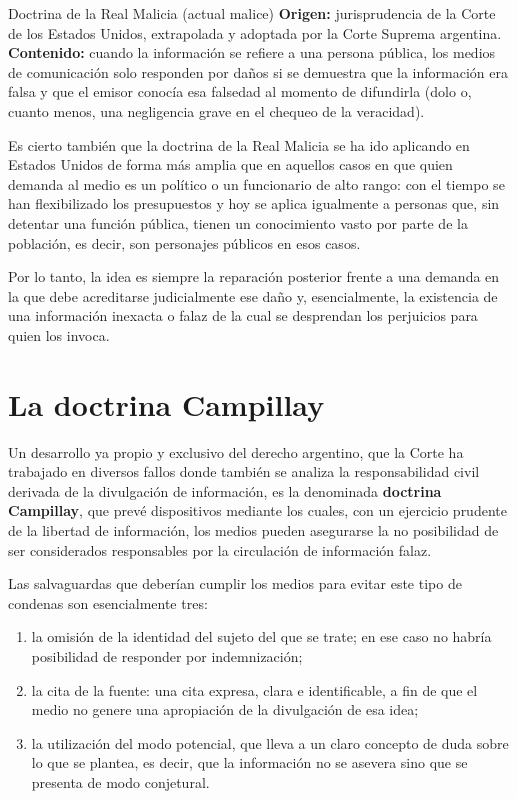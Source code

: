 \documentclass[12pt,oneside]{book}
\begin{document}
\begin{definition}{Doctrina de la Real Malicia (actual malice)}
\textbf{Origen:} jurisprudencia de la Corte de los Estados Unidos, extrapolada y adoptada por la Corte Suprema argentina. \textbf{Contenido:} cuando la información se refiere a una persona pública, los medios de comunicación solo responden por daños si se demuestra que la información era falsa y que el emisor conocía esa falsedad al momento de difundirla (dolo o, cuanto menos, una negligencia grave en el chequeo de la veracidad).
\end{definition}

Es cierto también que la doctrina de la Real Malicia se ha ido aplicando en Estados Unidos de forma más amplia que en aquellos casos en que quien demanda al medio es un político o un funcionario de alto rango: con el tiempo se han flexibilizado los presupuestos y hoy se aplica igualmente a personas que, sin detentar una función pública, tienen un conocimiento vasto por parte de la población, es decir, son personajes públicos en esos casos.

Por lo tanto, la idea es siempre la reparación posterior frente a una demanda en la que debe acreditarse judicialmente ese daño y, esencialmente, la existencia de una información inexacta o falaz de la cual se desprendan los perjuicios para quien los invoca.

\section{La doctrina Campillay}

Un desarrollo ya propio y exclusivo del derecho argentino, que la Corte ha trabajado en diversos fallos donde también se analiza la responsabilidad civil derivada de la divulgación de información, es la denominada \textbf{doctrina Campillay}, que prevé dispositivos mediante los cuales, con un ejercicio prudente de la libertad de información, los medios pueden asegurarse la no posibilidad de ser considerados responsables por la circulación de información falaz.

Las salvaguardas que deberían cumplir los medios para evitar este tipo de condenas son esencialmente tres:

\begin{enumerate}
    \item la omisión de la identidad del sujeto del que se trate; en ese caso no habría posibilidad de responder por indemnización;
    \item la cita de la fuente: una cita expresa, clara e identificable, a fin de que el medio no genere una apropiación de la divulgación de esa idea;
    \item la utilización del modo potencial, que lleva a un claro concepto de duda sobre lo que se plantea, es decir, que la información no se asevera sino que se presenta de modo conjetural.
\end{enumerate}
\end{document}
